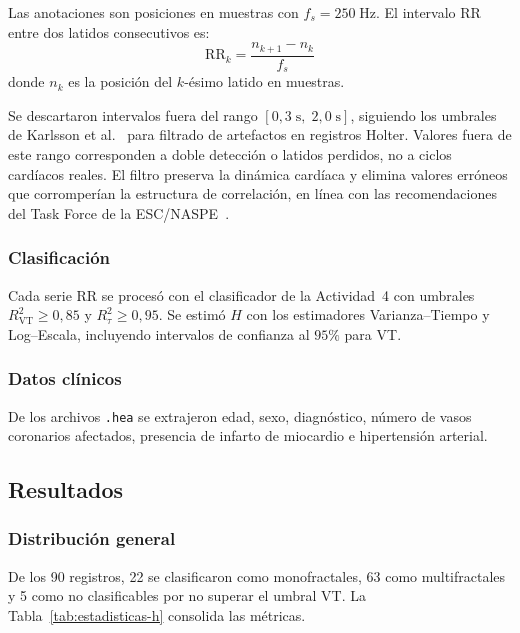 Las anotaciones son posiciones en muestras con $f_s = 250\;\text{Hz}$. El
intervalo RR entre dos latidos consecutivos es:
%
\begin{equation}
    \text{RR}_k = \frac{n_{k+1} - n_k}{f_s}
    \label{eq:rr}
\end{equation}
%
donde $n_k$ es la posición del $k$-ésimo latido en muestras.

Se descartaron intervalos fuera del rango
$[0{,}3\;\text{s},\;2{,}0\;\text{s}]$, siguiendo los umbrales de Karlsson
et al.~\cite{karlsson2012} para filtrado de artefactos en registros Holter.
Valores fuera de este rango corresponden a doble detección
o latidos perdidos, no a ciclos cardíacos reales. El filtro preserva la
dinámica cardíaca y elimina valores erróneos que corromperían la estructura
de correlación, en línea con las recomendaciones del Task Force de la
ESC/NASPE~\cite{taskforce1996}.

\subsubsection{Clasificación}

Cada serie RR se procesó con el clasificador de la Actividad~4 con umbrales
$R^2_{\text{VT}} \geq 0{,}85$ y $R^2_{\tau} \geq 0{,}95$. Se estimó $H$
con los estimadores Varianza--Tiempo y Log--Escala, incluyendo intervalos de
confianza al $95\%$ para VT.

\subsubsection{Datos clínicos}

De los archivos \texttt{.hea} se extrajeron edad, sexo, diagnóstico, número
de vasos coronarios afectados, presencia de infarto de miocardio e
hipertensión arterial.

\subsection{Resultados}

\subsubsection{Distribución general}

De los 90 registros, 22 se clasificaron como monofractales, 63 como
multifractales y 5 como no clasificables por no superar el umbral VT.
La Tabla~\ref{tab:estadisticas-h} consolida las métricas.

